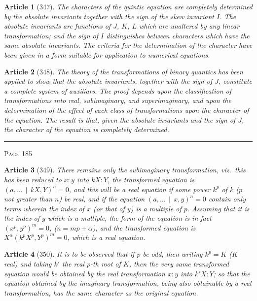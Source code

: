 \documentclass[11pt,a4paper]{article}
\theoremstyle{cayley}
\newtheorem{art}{Article}
\begin{document}
\begin{art}[347]
The characters of the quintic equation are completely determined by the absolute invariants together with the sign of the skew invariant $I$. The absolute invariants are functions of $J$, $K$, $L$ which are unaltered by any linear transformation; and the sign of $I$ distinguishes between characters which have the same absolute invariants. The criteria for the determination of the character have been given in a form suitable for application to numerical equations.
\end{art}

\begin{art}[348]
The theory of the transformations of binary quantics has been applied to show that the absolute invariants, together with the sign of $J$, constitute a complete system of auxiliars. The proof depends upon the classification of transformations into real, subimaginary, and superimaginary, and upon the determination of the effect of each class of transformations upon the character of the equation. The result is that, given the absolute invariants and the sign of $J$, the character of the equation is completely determined.
\end{art}

\vspace{1em}
\noindent\rule{\textwidth}{0.4pt}
\begin{center}\textsc{Page 185}\end{center}
\newpage

\begin{art}[349]
There remains only the subimaginary transformation, viz.\ this has been reduced to $x:y$ into $kX:Y$, the transformed equation is $(a, \ldots \,\mid\, kX, Y)^n = 0$, and this will be a real equation if some power $k^p$ of $k$ ($p$ not greater than $n$) be real, and if the equation $(a, \ldots \,\mid\, x, y)^n = 0$ contain only terms wherein the index of $x$ (or that of $y$) is a multiple of $p$. Assuming that it is the index of $y$ which is a multiple, the form of the equation is in fact $(x^p, y^p)^m = 0$, ($n = mp + \alpha$), and the transformed equation is $X^\alpha(k^pX^p, Y^p)^m = 0$, which is a real equation.
\end{art}

\begin{art}[350]
It is to be observed that if $p$ be odd, then writing $k^p = K$ ($K$ real) and taking $k'$ the real $p$-th root of $K$, then the very same transformed equation would be obtained by the real transformation $x:y$ into $k'X:Y$; so that the equation obtained by the imaginary transformation, being also obtainable by a real transformation, has the same character as the original equation.
\end{art}
\end{document}
